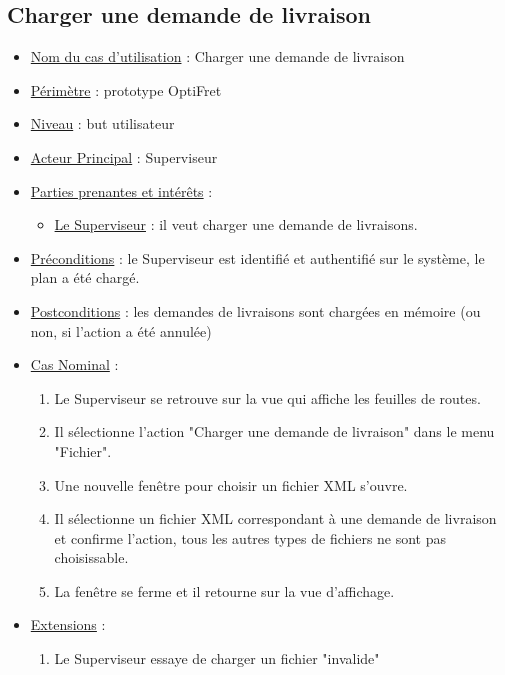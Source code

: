 \documentclass[a4paper]{report}
\begin{document}
\subsection{Charger une demande de livraison}
\begin{itemize}[label = \textbullet, font = \color{orange}]
    \item \underline{Nom du cas d'utilisation} : Charger une demande de
        livraison
    \item \underline{Périmètre} : prototype OptiFret
    \item \underline{Niveau} : but utilisateur
    \item \underline{Acteur Principal} : Superviseur
    \item \underline{Parties prenantes et intérêts} :
    \begin{itemize}[label = \textbullet, font = \color{blue}]
        \item \underline{Le Superviseur} : il veut charger une demande de
            livraisons.
    \end{itemize}
    \item \underline{Préconditions} : le Superviseur est identifié et
        authentifié sur le système, le plan a été chargé.
    \item \underline{Postconditions} : les demandes de livraisons sont chargées
        en mémoire (ou non, si l'action a été annulée)
    \item \underline{Cas Nominal} :
    \begin{enumerate}
        \item Le Superviseur se retrouve sur la vue qui affiche les feuilles de
            routes.
        \item Il sélectionne l'action "Charger une demande de livraison" dans
            le menu "Fichier".
        \item Une nouvelle fenêtre pour choisir un fichier XML s'ouvre.
        \item Il sélectionne un fichier XML correspondant à une demande de
            livraison et confirme l'action, tous les autres types de fichiers
            ne sont pas choisissable.
        \item La fenêtre se ferme et il retourne sur la vue d'affichage.
    \end{enumerate}
    \item \underline{Extensions} :
    \begin{enumerate}
        \item Le Superviseur essaye de charger un fichier "invalide"

\end{enumerate}
\end{itemize}
\end{document}
